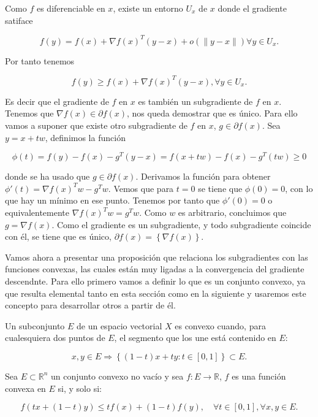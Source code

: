 Como $f$ es diferenciable en $x$, existe un entorno $U_x$ de $x$ donde el gradiente satiface 

$$  f(y) = f(x) + \nabla f(x)^T(y-x) + o(\|y-x \|) \forall y \in U_x.$$

Por tanto tenemos

$$ f(y) \geq f(x) + \nabla f(x)^T(y-x), \forall y \in U_x.$$

Es decir que el gradiente de $f$ en $x$ es también un subgradiente de $f$ en $x$. Tenemos que $\nabla f(x) \in \partial f(x)$, nos queda demostrar que es único. Para ello vamos a suponer que existe otro subgradiente de $f$ en $x$, $g \in \partial f(x)$. Sea $y=x+tw$, definimos la función

$$\phi(t)=f(y)-f(x)- g^T(y-x) = f(x+tw) -f(x) - g^T(tw) \geq 0$$

donde se ha usado que $g \in \partial f(x)$. Derivamos la función para obtener $\phi'(t) = \nabla f(x)^Tw - g^Tw$. Vemos que para $t=0$ se tiene que $\phi(0)=0$, con lo que hay un mínimo en ese punto. Tenemos por tanto que $\phi'(0)=0$ o equivalentemente $\nabla f(x)^Tw=g^Tw$. Como $w$ es arbitrario, concluimos que $g=\nabla f(x)$. Como el gradiente es un subgradiente, y todo subgradiente coincide con él, se tiene que es único, $\partial f(x) = \left \{ \nabla f(x) \right \}$. 



Vamos ahora a presentar una proposición que relaciona los subgradientes con las funciones convexas, las cuales están muy ligadas a la convergencia del gradiente descendnte. Para ello primero vamos a definir lo que es un conjunto convexo, ya que resulta elemental tanto en esta sección como en la siguiente y usaremos este concepto para desarrollar otros a partir de él.


\begin{definicion}
    Un subconjunto $E$ de un espacio vectorial $X$ es convexo cuando, para cualesquiera dos puntos de $E$, el segmento que los une está contenido en $E$:

    $$x,y \in E \Rightarrow \left \{ (1-t)x + ty : t\in [0,1] \right \} \subset E.$$
\end{definicion}




\begin{definicion}
    Sea $E \subset \mathbb{R}^n$ un conjunto convexo no vacío y sea $f:E \rightarrow \mathbb{R}$, $f$ es una función convexa en $E$ si, y solo si:

    $$f(tx + (1-t)y) \leq tf(x) + (1-t) f(y), \quad \forall t \in [0,1], \forall x,y \in E.$$
\end{definicion}

